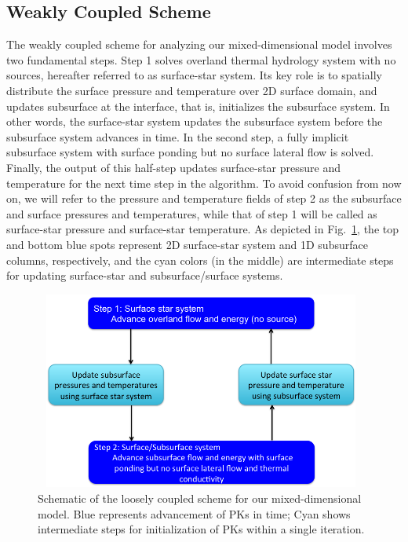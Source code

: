 \documentclass[review]{elsarticle}
\begin{document}
\subsection{Weakly Coupled Scheme}
The weakly coupled scheme for analyzing our mixed-dimensional model involves two fundamental steps. Step 1 solves overland thermal hydrology system with no sources, hereafter referred to as surface-star system. Its key role is to spatially distribute the surface pressure and temperature over 2D surface domain, and updates subsurface at the interface, that is, initializes the subsurface system. In other words, the surface-star system updates the subsurface system before the subsurface system advances in time. In the second step, a fully implicit subsurface system with surface ponding but no surface lateral flow is solved. Finally, the output of this half-step updates surface-star pressure and temperature for the next time step in the algorithm. To avoid confusion from now on, we will refer to the pressure and temperature fields of step 2 as the subsurface and surface pressures and temperatures, while that of step 1 will be called as surface-star pressure and surface-star temperature. As depicted in Fig.~\ref{coupling-schematic}, the top and bottom blue spots represent 2D surface-star system and 1D subsurface columns, respectively, and the cyan colors (in the middle) are intermediate steps for updating surface-star and subsurface/surface systems.


\begin{figure}[!htpb]
\centering
\includegraphics[height = 6.5cm, width=11cm]{figures/shematic-couplingscheme1.png}
\caption{Schematic of the loosely coupled scheme for our mixed-dimensional model. Blue represents advancement of PKs in time; Cyan shows intermediate steps for initialization of PKs within a single iteration.}
\label{coupling-schematic}
\end{figure}
\end{document}

